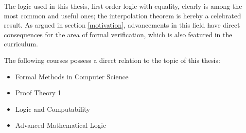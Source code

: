 \documentclass[,%
			paper=a4,%
			DIV12,
			liststotoc,
			bibtotoc,
			draft=false,%
			numbers=noendperiod
			]{scrartcl}
\theoremstyle{definition}
\begin{document}
The logic used in this thesis, first-order logic with equality, clearly is among the most common and useful ones; the interpolation theorem is hereby a celebrated result.
As argued in section \ref{motivation}, advancements in this field have direct consequences for the area of formal verification, which is also featured in the curriculum.

The following courses possess a direct relation to the topic of this thesis: 
\begin{itemize}
	\item Formal Methods in Computer Science
	\item Proof Theory 1 
	\item Logic and Computability 
	\item Advanced Mathematical Logic 
\end{itemize}


\nocite{*} %


\end{document}
